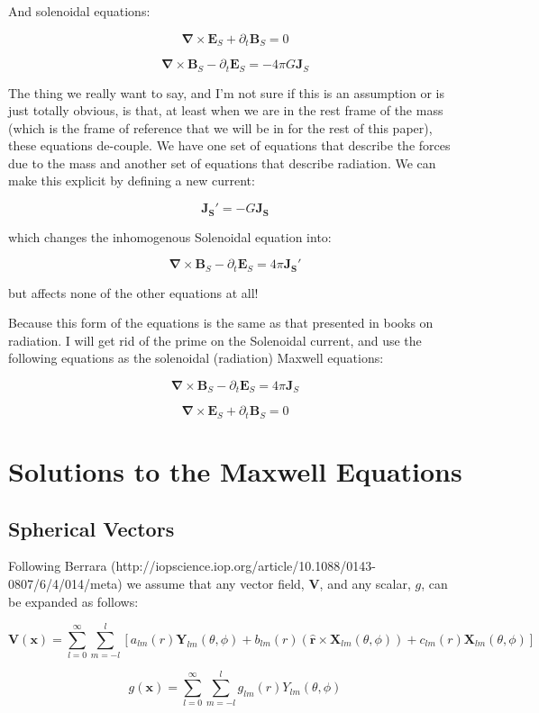 \documentclass {article}
\renewcommand\vec{\mathbf}
\let\OldS\nabla
\renewcommand{\nabla}{\boldsymbol{\OldS}}
\let\OldHat\hat
\renewcommand{\hat}[1]{\OldHat{\mathbf{#1}}}
\begin{document}
And solenoidal equations:

$$\nabla \times \vec E_S + \partial_t \vec B_S = 0 $$

$$\nabla \times \vec B_S - \partial_t \vec E_S =  - 4 \pi G \vec J_S$$

The thing we really want to say, and I'm not sure if this is an assumption or is just totally obvious, is that, at least when we are in the rest frame of the mass (which is the frame of reference that we will be in for the rest of this paper), these equations de-couple. We have one set of equations that describe the forces due to the mass and another set of equations that describe radiation. We can make this explicit by defining a new current:

$$\vec {J_S'} = - G \vec {J_S}$$

which changes the inhomogenous Solenoidal equation into:

$$\nabla \times \vec B_S - \partial_t \vec E_S =  4 \pi \vec {J_S'} $$

but affects none of the other equations at all!

Because this form of the equations is the same as that presented in books on radiation. I will get rid of the prime on the Solenoidal current, and use the following equations as the solenoidal (radiation) Maxwell equations:

$$\nabla \times \vec B_S - \partial_t \vec E_S =  4 \pi \vec J_S$$

$$\nabla \times \vec E_S + \partial_t \vec B_S = 0 $$
\newpage

\section{Solutions to the Maxwell Equations}
\subsection{Spherical Vectors}
Following Berrara (http://iopscience.iop.org/article/10.1088/0143-0807/6/4/014/meta) we assume that any vector field, $\vec V$, and any scalar, $g$, can be expanded as follows:

$$\vec V (\vec x) = \sum_{l=0}^{\infty} \sum_{m=-l}^{l} \left[a_{lm}(r) \vec Y_{lm}(\theta, \phi) +b_{lm}(r) \left( \hat r \times \vec X_{lm} (\theta, \phi) \right) +c_{lm}(r) \vec X_{lm} (\theta, \phi) \right] $$

$$g(\vec x) = \sum_{l=0}^{\infty} \sum_{m=-l}^{l} g_{lm}(r) Y_{lm}(\theta, \phi)$$
\end{document}
